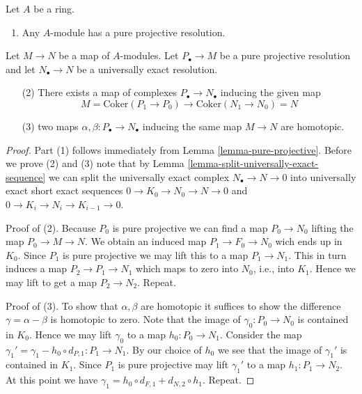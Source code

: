 \begin{lemma}
\label{lemma-pure-projective-resolutions}
Let $A$ be a ring.
\begin{enumerate}
\item Any $A$-module has a pure projective resolution.
\end{enumerate}
Let $M \to N$ be a map of $A$-modules.
Let $P_\bullet \to M$ be a pure projective resolution and
let $N_\bullet \to N$ be a universally exact resolution.
\begin{enumerate}
\item[(2)] There exists a map of complexes $P_\bullet \to N_\bullet$
inducing the given map
$$
M = \text{Coker}(P_1 \to P_0) \to \text{Coker}(N_1 \to N_0) = N
$$
\item[(3)] two maps $\alpha, \beta : P_\bullet \to N_\bullet$
inducing the same map $M \to N$ are homotopic.
\end{enumerate}
\end{lemma}

\begin{proof}
Part (1) follows immediately from
Lemma \ref{lemma-pure-projective}.
Before we prove (2) and (3) note that by
Lemma \ref{lemma-split-universally-exact-sequence}
we can split the universally exact complex $N_\bullet \to N \to 0$
into universally exact short exact sequences $0 \to K_0 \to N_0 \to N \to 0$
and $0 \to K_i \to N_i \to K_{i - 1} \to 0$.

\medskip\noindent
Proof of (2). Because $P_0$ is pure projective
we can find a map $P_0 \to N_0$ lifting the map $P_0 \to M \to N$.
We obtain an induced map $P_1 \to F_0 \to N_0$ wich ends up in $K_0$.
Since $P_1$ is pure projective we may lift this
to a map $P_1 \to N_1$. This in turn induces a map
$P_2 \to P_1 \to N_1$ which maps to zero into
$N_0$, i.e., into $K_1$. Hence we may lift to get a map
$P_2 \to N_2$. Repeat.

\medskip\noindent
Proof of (3). To show that $\alpha, \beta$ are homotopic it suffices
to show the difference $\gamma = \alpha - \beta$ is homotopic
to zero. Note that the image of $\gamma_0 : P_0 \to N_0$
is contained in $K_0$. Hence we may lift
$\gamma_0$ to a map $h_0 : P_0 \to N_1$. Consider the map
$\gamma_1' = \gamma_1 - h_0 \circ d_{P, 1} : P_1 \to N_1$.
By our choice of $h_0$ we see that the image of $\gamma_1'$
is contained in $K_1$. Since $P_1$ is pure projective may lift
$\gamma_1'$ to a map $h_1 : P_1 \to N_2$. At this point we have
$\gamma_1 = h_0 \circ d_{F, 1} + d_{N, 2} \circ h_1$. Repeat.
\end{proof}


